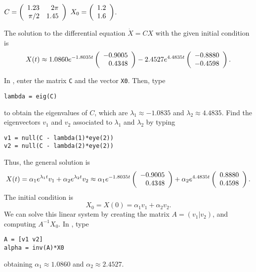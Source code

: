 \documentclass{ximera}
\begin{document}
\begin{computerExercise}  \label{c4.10A.3b}
$C = \left(\begin{array}{rr} 1.23 & 2\pi\\ \pi/2 &1.45\end{array}\right)$ \AND $X_0 = \left(\begin{array}{r} 1.2 \\ 1.6\end{array}\right)$.

\begin{solution}
\ans The solution to the differential equation $\dot{X}
= CX$ with the given initial condition is
\[
X(t) \approx 1.0860e^{-1.8035t}\left(\begin{array}{r} -0.9005 \\  0.4348\end{array}\right)
- 2.4527e^{4.4835t}\left(\begin{array}{r} -0.8880 \\ -0.4598\end{array}\right).
\]

\soln In \Matlabp, enter the matrix {\tt C} and the vector {\tt X0}.  Then,
type
\begin{verbatim}
lambda = eig(C)
\end{verbatim}
to obtain the eigenvalues of $C$, which are
$\lambda_1 \approx -1.0835$ and $\lambda_2 \approx 4.4835$.  Find the
eigenvectors $v_1$ and $v_2$ associated to $\lambda_1$ and $\lambda_2$
by typing
\begin{verbatim}
v1 = null(C - lambda(1)*eye(2))
v2 = null(C - lambda(2)*eye(2))
\end{verbatim}
Thus, the general solution is
\[
X(t) = \alpha_1e^{\lambda_1 t}v_1 + \alpha_2e^{\lambda_2 t}v_2
\approx \alpha_1e^{-1.8035t}\left(\begin{array}{r} -0.9005 \\  0.4348\end{array}\right) +
\alpha_2e^{4.4835t}\left(\begin{array}{r} 0.8880 \\ 0.4598\end{array}\right).
\]
The initial condition is
\[
X_0 = X(0) = \alpha_1v_1 + \alpha_2v_2.
\]
We can solve this linear system by creating the matrix $A = (v_1|v_2)$, and
computing $A^{-1}X_0$.  In \Matlabp, type
\begin{verbatim}
A = [v1 v2]
alpha = inv(A)*X0
\end{verbatim}
obtaining $\alpha_1 \approx 1.0860$ and $\alpha_2 \approx 2.4527$.

\end{solution}
\end{computerExercise}
\end{document}
